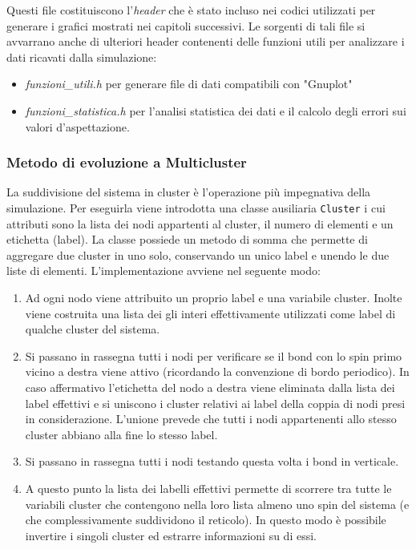 Questi file costituiscono l'\emph{header} che è stato incluso nei codici utilizzati per generare i grafici mostrati nei capitoli successivi. 
Le sorgenti di tali file si avvarrano anche di ulteriori header contenenti delle funzioni utili per analizzare i dati ricavati dalla simulazione:
\begin{itemize}
\item \emph{funzioni\_utili.h} per generare file di dati compatibili con "Gnuplot"
\item \emph{funzioni\_statistica.h} per l'analisi statistica dei dati e il calcolo degli errori sui valori d'aspettazione.
\end{itemize}

\subsubsection*{Metodo di evoluzione a Multicluster}
La suddivisione del sistema in cluster è l'operazione più impegnativa della simulazione. Per eseguirla viene introdotta una classe ausiliaria \texttt{Cluster} i cui attributi sono la lista dei nodi appartenti al cluster, il numero di elementi e un etichetta (label).
La classe possiede un metodo di somma che permette di aggregare due cluster in uno solo, conservando un unico label e unendo le due liste di elementi.
L'implementazione avviene nel seguente modo:
\begin{enumerate}
\item Ad ogni nodo viene attribuito un proprio label e una variabile cluster. Inolte viene costruita una lista dei gli interi effettivamente utilizzati come label di qualche cluster del sistema.
\item Si passano in rassegna tutti i nodi per verificare se il bond con lo spin primo vicino a destra viene attivo (ricordando la convenzione di bordo periodico).\newline
In caso affermativo l'etichetta del nodo a destra viene eliminata dalla lista dei label effettivi e si uniscono i cluster relativi ai label della coppia di nodi presi in considerazione. L'unione prevede che tutti i nodi appartenenti allo stesso cluster abbiano alla fine lo stesso label.
\item Si passano in rassegna tutti i nodi testando questa volta i bond in verticale.
\item A questo punto la lista dei labelli effettivi permette di scorrere tra tutte le variabili cluster che contengono nella loro lista almeno uno spin del sistema (e che complessivamente suddividono il reticolo). In questo modo è possibile invertire i  singoli cluster ed estrarre informazioni su di essi.
\end{enumerate}